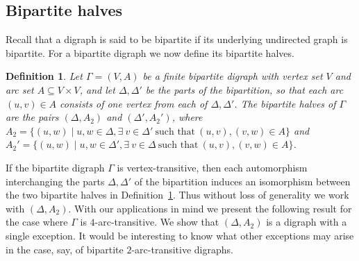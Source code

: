 \documentclass[11pt]{amsart}
\newtheorem{definition}[theorem]{Definition}
\begin{document}
\subsection{Bipartite halves}\label{s:bipartite}

Recall that a digraph is said to be bipartite if its underlying undirected graph is bipartite. For a bipartite digraph we now define its bipartite halves. 


\begin{definition}\label{d:biphalf}
{\rm 
    Let  \(\Gamma=(V,A)\) be a finite bipartite digraph with vertex set $V$ and arc set $A\subseteq V\times V$, and let $\Delta, \Delta'$ be the parts of the bipartition, so that each arc $(u,v)\in A$ consists of one vertex from each of $\Delta, \Delta'$. The \emph{bipartite halves} of $\Gamma$ are the pairs $(\Delta, A_2)$ and $(\Delta', A_2')$, where 
    $A_2=\{(u,w)\mid u, w\in \Delta, \exists\ v\in\Delta'\ \mbox{such that}\ (u,v), (v,w)\in A\}$ and 
    $A_2'=\{(u,w)\mid u, w\in \Delta', \exists\ v\in\Delta\ \mbox{such that}\ (u,v), (v,w)\in A\}$. 
    }
\end{definition}

If the bipartite digraph $\Gamma$ is vertex-transitive, then each automorphism interchanging the parts $\Delta, \Delta'$ of the bipartition induces an isomorphism between the two bipartite halves in Definition~\ref{d:biphalf}. Thus without loss of generality we work with  $(\Delta, A_2)$.  With our applications in mind we present the following result for the case where $\Gamma$ is $4$-arc-transitive. We show that $(\Delta, A_2)$ is a digraph with a single exception. It would be interesting to know what other exceptions may arise in the case, say, of bipartite $2$-arc-transitive digraphs. 


\end{document}
